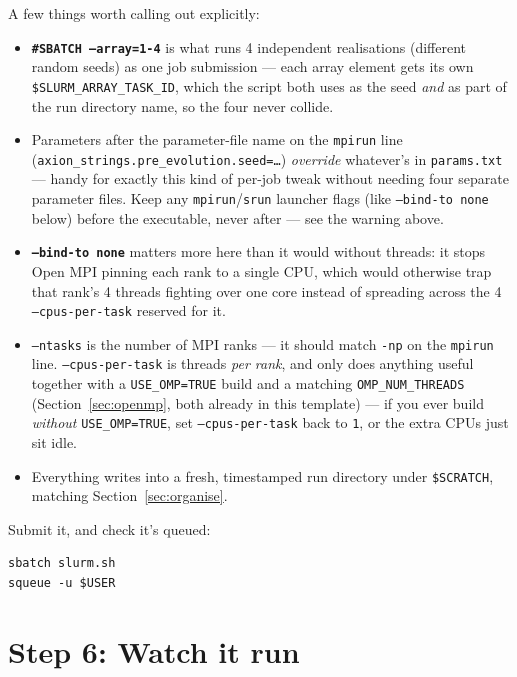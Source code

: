 \documentclass[11pt]{article}
\begin{document}
A few things worth calling out explicitly:
\begin{itemize}
  \item \textbf{\texttt{\#SBATCH --array=1-4}} is what runs 4 independent realisations (different random
        seeds) as one job submission --- each array element gets its own
        \texttt{\$SLURM\_ARRAY\_TASK\_ID}, which the script both uses as the seed \emph{and} as part of the
        run directory name, so the four never collide.
  \item Parameters after the parameter-file name on the \texttt{mpirun} line
        (\texttt{axion\_strings.pre\_evolution.seed=\dots}) \emph{override} whatever's in \texttt{params.txt}
        --- handy for exactly this kind of per-job tweak without needing four separate parameter files.
        Keep any \texttt{mpirun}/\texttt{srun} launcher flags (like \texttt{--bind-to none} below) before
        the executable, never after --- see the warning above.
  \item \textbf{\texttt{--bind-to none}} matters more here than it would without threads: it stops Open MPI
        pinning each rank to a single CPU, which would otherwise trap that rank's 4 threads fighting over
        one core instead of spreading across the 4 \texttt{--cpus-per-task} reserved for it.
  \item \texttt{--ntasks} is the number of MPI ranks --- it should match \texttt{-np} on the
        \texttt{mpirun} line. \texttt{--cpus-per-task} is threads \emph{per rank}, and only does anything
        useful together with a \texttt{USE\_OMP=TRUE} build and a matching \texttt{OMP\_NUM\_THREADS}
        (Section~\ref{sec:openmp}, both already in this template) --- if you ever build \emph{without}
        \texttt{USE\_OMP=TRUE}, set \texttt{--cpus-per-task} back to \texttt{1}, or the extra CPUs just sit
        idle.
  \item Everything writes into a fresh, timestamped run directory under \texttt{\$SCRATCH}, matching
        Section~\ref{sec:organise}.
\end{itemize}

Submit it, and check it's queued:

\begin{lstlisting}
sbatch slurm.sh
squeue -u $USER
\end{lstlisting}

\section{Step 6: Watch it run}
\label{sec:watch-it-run}
\end{document}
